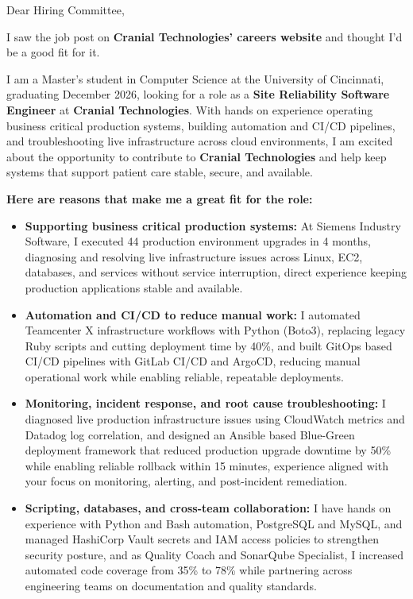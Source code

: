 \documentclass[11pt]{letter}
\date{}
\begin{document}
\begin{letter}{}

\opening{Dear Hiring Committee,}

I saw the job post on \textbf{Cranial Technologies' careers website} and thought I'd be a good fit for it.

I am a Master's student in Computer Science at the University of Cincinnati, graduating December 2026, looking for a role as a \textbf{Site Reliability Software Engineer} at \textbf{Cranial Technologies}. With hands on experience operating business critical production systems, building automation and CI/CD pipelines, and troubleshooting live infrastructure across cloud environments, I am excited about the opportunity to contribute to \textbf{Cranial Technologies} and help keep systems that support patient care stable, secure, and available.

\textbf{Here are reasons that make me a great fit for the role:}

\begin{itemize}[leftmargin=*, itemsep=0.45em]
    \item \textbf{Supporting business critical production systems:} At Siemens Industry Software, I executed 44 production environment upgrades in 4 months, diagnosing and resolving live infrastructure issues across Linux, EC2, databases, and services without service interruption, direct experience keeping production applications stable and available.

    \item \textbf{Automation and CI/CD to reduce manual work:} I automated Teamcenter X infrastructure workflows with Python (Boto3), replacing legacy Ruby scripts and cutting deployment time by 40\%, and built GitOps based CI/CD pipelines with GitLab CI/CD and ArgoCD, reducing manual operational work while enabling reliable, repeatable deployments.

    \item \textbf{Monitoring, incident response, and root cause troubleshooting:} I diagnosed live production infrastructure issues using CloudWatch metrics and Datadog log correlation, and designed an Ansible based Blue-Green deployment framework that reduced production upgrade downtime by 50\% while enabling reliable rollback within 15 minutes, experience aligned with your focus on monitoring, alerting, and post-incident remediation.

    \item \textbf{Scripting, databases, and cross-team collaboration:} I have hands on experience with Python and Bash automation, PostgreSQL and MySQL, and managed HashiCorp Vault secrets and IAM access policies to strengthen security posture, and as Quality Coach and SonarQube Specialist, I increased automated code coverage from 35\% to 78\% while partnering across engineering teams on documentation and quality standards.
\end{itemize}


\end{letter}
\end{document}

